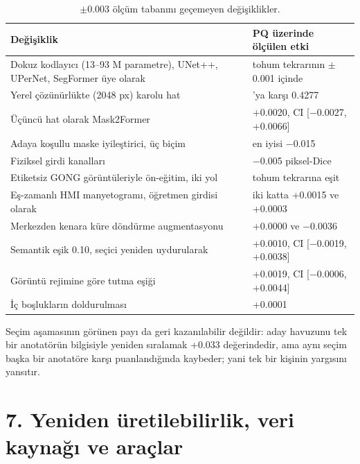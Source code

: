 \begin{table}[t]
\centering\footnotesize
\caption{$\pm$0.003 ölçüm tabanını geçemeyen değişiklikler.}
\begin{tabular}{@{}
  >{\raggedright\arraybackslash}p{}
  >{\raggedright\arraybackslash}p{}@{}}
\toprule
\begin{minipage}[b]{\linewidth}\raggedright
Değişiklik
\end{minipage} & \begin{minipage}[b]{\linewidth}\raggedright
PQ üzerinde ölçülen etki
\end{minipage} \\
\midrule
Dokuz kodlayıcı (13--93 M parametre), UNet++, UPerNet, SegFormer üye olarak & tohum tekrarının $\pm$0.001 içinde \\
Yerel çözünürlükte (2048 px) karolu hat & 0.4286'ya karşı 0.4277 \\
Üçüncü hat olarak Mask2Former & +0.0020, CI {[}$-$0.0027, +0.0066{]} \\
Adaya koşullu maske iyileştirici, üç biçim & en iyisi $-$0.015 \\
Fiziksel girdi kanalları & $-$0.005 piksel-Dice \\
Etiketsiz GONG görüntüleriyle ön-eğitim, iki yol & tohum tekrarına eşit \\
Eş-zamanlı HMI manyetogramı, öğretmen girdisi olarak & iki katta +0.0015 ve +0.0003 \\
Merkezden kenara küre döndürme augmentasyonu & +0.0000 ve $-$0.0036 \\
Semantik eşik 0.10, seçici yeniden uydurularak & +0.0010, CI {[}$-$0.0019, +0.0038{]} \\
Görüntü rejimine göre tutma eşiği & +0.0019, CI {[}$-$0.0006, +0.0044{]} \\
İç boşlukların doldurulması & +0.0001 \\
\bottomrule
\end{tabular}
\end{table}

Seçim aşamasının görünen payı da geri kazanılabilir değildir: aday havuzunu tek bir anotatörün
bilgisiyle yeniden sıralamak +0.033 değerindedir, ama aynı seçim başka bir anotatöre karşı
puanlandığında kaybeder; yani tek bir kişinin yargısını yansıtır.

\section{7. Yeniden üretilebilirlik, veri kaynağı ve araçlar}\label{yeniden-uxfcretilebilirlik-veri-kaynaux11fux131-ve-arauxe7lar}

